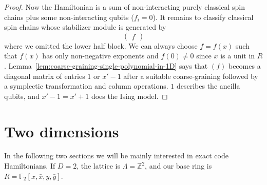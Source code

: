 \documentclass[letterpaper,12pt]{amsart}
\theoremstyle{definition} \newtheorem{defn}{Definition}
\theoremstyle{definition} \newtheorem{rem}{Remark}
\theoremstyle{definition} \newtheorem{example}{Example}
\newcommand{\FF}{\mathbb{F}}
\begin{document}
\begin{proof}
Now the Hamiltonian is a sum of non-interacting purely classical spin chains
plus some non-interacting qubits ($f_i = 0$).
It remains to classify classical spin chains
whose stabilizer module is generated by
\[
\begin{pmatrix}
f
\end{pmatrix}
\]
where we omitted the lower half block.
We can always choose $f=f(x)$ such that $f(x)$ has only non-negative exponents and
$f(0)\ne 0$ since $x$ is a unit in $R$.
Lemma~\ref{lem:coarse-graining-single-polynomial-in-1D} says that
$(f)$ becomes a diagonal matrix of entries $1$ or $x'-1$
after a suitable coarse-graining followed by a symplectic transformation
and column operations.
$1$ describes the ancilla qubits,
and $x'-1 = x'+1$ does the Ising model.
\end{proof}

\section{Two dimensions}
In the following two sections we will be mainly interested in exact code Hamiltonians.
If $D=2$, the lattice is $\Lambda = \mathbb{Z}^2$, and our base ring is $R = \FF_2 [x,\bar x, y, \bar y]$.
\end{document}
